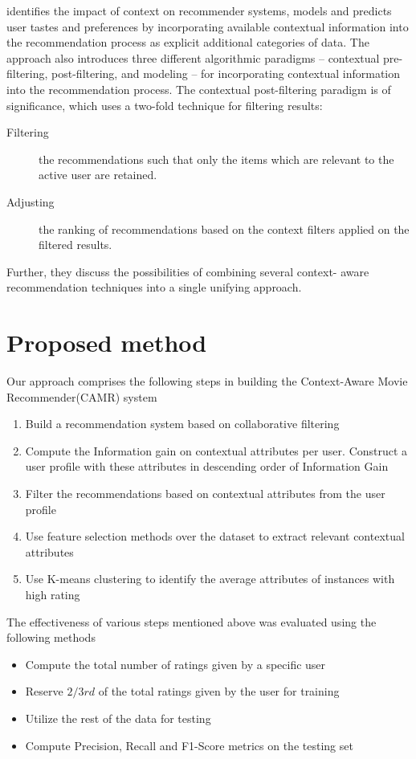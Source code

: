 \documentclass{article}
\begin{document}
\cite{adomavicius2011context} identifies the impact of context on recommender systems, models and predicts user tastes and preferences by incorporating available contextual information into the recommendation process as explicit additional categories of data. The approach also introduces three different algorithmic paradigms – contextual pre-filtering, post-filtering, and modeling – for incorporating contextual information into the recommendation process. The contextual post-filtering paradigm is of significance, which uses a two-fold technique for filtering results:

\begin{description}
\item[Filtering] the recommendations such that only the items which are relevant to the active user are retained.
\item[Adjusting] the ranking of recommendations based on the context filters applied on the filtered results.
\end{description}

Further, they discuss the possibilities of combining several context- aware recommendation techniques into a single unifying approach.

\section{Proposed method}

Our approach comprises the following steps in building the Context-Aware Movie Recommender(CAMR) system

\begin{enumerate}
\item Build a recommendation system based on collaborative filtering
\item Compute the Information gain on contextual attributes per user. Construct a user profile with these attributes in descending order of Information Gain 
\item Filter the recommendations based on contextual attributes from the user profile 
\item Use feature selection methods over the dataset to extract relevant contextual attributes
\item Use K-means clustering to identify the average attributes of instances with high rating
\end{enumerate}

The effectiveness of various steps mentioned above was evaluated using the following methods
\begin{itemize}
\item Compute the total number of ratings given by a specific user 
\item Reserve $2/3rd$ of the total ratings given by the user for training
\item Utilize the rest of the data for testing
\item Compute Precision, Recall and F1-Score metrics on the testing set 
\end{itemize}
\end{document}
